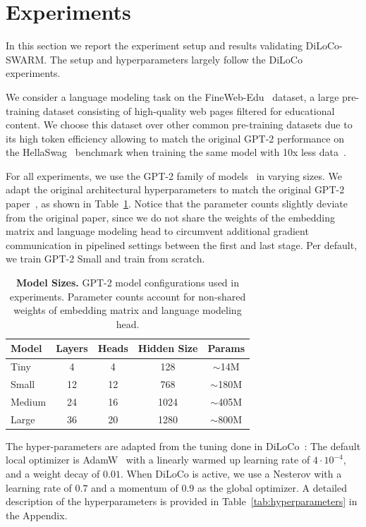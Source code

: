 \documentclass{article}
\begin{document}
\section{Experiments}

In this section we report the experiment setup and results validating
DiLoCo-SWARM. The setup and hyperparameters largely follow the
DiLoCo~\cite{douillard2023diloco} experiments.

We consider a language modeling task on the FineWeb-Edu~\cite{penedo2024fineweb}
dataset, a large pre-training dataset consisting of high-quality web pages
filtered for educational content. We choose this dataset over other common
pre-training datasets due to its high token efficiency allowing to match the
original GPT-2 performance on the HellaSwag~\cite{zellers2019hellaswag}
benchmark when training the same model with 10x less
data~\cite{karpathy2024nanogpt}.

For all experiments, we use the GPT-2 family of models~\cite{radford2019gpt2} in
varying sizes. We adapt the original architectural hyperparameters to match the
original GPT-2 paper~\cite{radford2019gpt2}, as shown in Table~\ref{tab:models}.
Notice that the parameter counts slightly deviate from the original paper, since
we do not share the weights of the embedding matrix and language modeling head
to circumvent additional gradient communication in pipelined settings between
the first and last stage. Per default, we train GPT-2 Small and train from
scratch.

\begin{table}[h]
\centering
\begin{tabular}{lcccc}
\toprule
\textbf{Model} & \textbf{Layers} & \textbf{Heads} & \textbf{Hidden Size} & \textbf{Params} \\
\midrule
Tiny & 4 & 4 & 128 & $\sim$14M \\
Small & 12 & 12 & 768 & $\sim$180M \\
Medium & 24 & 16 & 1024 & $\sim$405M \\
Large & 36 & 20 & 1280 & $\sim$800M \\
\bottomrule
\end{tabular}
\caption{\textbf{Model Sizes.} GPT-2 model configurations used in experiments.
Parameter counts account for non-shared weights of embedding matrix and language
modeling head.}
\label{tab:models}
\end{table}

The hyper-parameters are adapted from the tuning done in
DiLoCo~\cite{douillard2023diloco}: The default local optimizer is
AdamW~\cite{loshchilov2019adamw} with a linearly warmed up learning rate of
$4\cdot 10^{-4}$, and a weight decay of $0.01$. When DiLoCo is active, we use a
Nesterov with a learning rate of $0.7$ and a momentum of $0.9$ as the global
optimizer. A detailed description of the hyperparameters is provided in
Table~\ref{tab:hyperparameters} in the Appendix.
\end{document}
